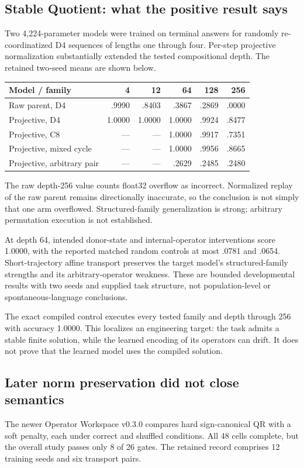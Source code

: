 \documentclass[11pt]{article}
\begin{document}
\subsection{Stable Quotient: what the positive result says}
Two 4,224-parameter models were trained on terminal answers for randomly re-coordinatized D4 sequences of lengths one through four. Per-step projective normalization substantially extended the tested compositional depth. The retained two-seed means are shown below. \cite{n02}

\begin{center}\begin{tabular}{lrrrrr}
\toprule Model / family & 4 & 12 & 64 & 128 & 256\\\midrule
Raw parent, D4 & .9990 & .8403 & .3867 & .2869 & .0000\\
Projective, D4 & 1.0000 & 1.0000 & 1.0000 & .9924 & .8477\\
Projective, C8 & --- & --- & 1.0000 & .9917 & .7351\\
Projective, mixed cycle & --- & --- & 1.0000 & .9956 & .8665\\
Projective, arbitrary pair & --- & --- & .2629 & .2485 & .2480\\\bottomrule
\end{tabular}\end{center}
The raw depth-256 value counts float32 overflow as incorrect. Normalized replay of the raw parent remains directionally inaccurate, so the conclusion is not simply that one arm overflowed. Structured-family generalization is strong; arbitrary permutation execution is not established.

At depth 64, intended donor-state and internal-operator interventions score 1.0000, with the reported matched random controls at most .0781 and .0654. Short-trajectory affine transport preserves the target model's structured-family strengths and its arbitrary-operator weakness. These are bounded developmental results with two seeds and supplied task structure, not population-level or spontaneous-language conclusions.

The exact compiled control executes every tested family and depth through 256 with accuracy 1.0000. This localizes an engineering target: the task admits a stable finite solution, while the learned encoding of its operators can drift. It does not prove that the learned model uses the compiled solution.

\subsection{Later norm preservation did not close semantics}
The newer Operator Workspace v0.3.0 compares hard sign-canonical QR with a soft penalty, each under correct and shuffled conditions. All 48 cells complete, but the overall study passes only 8 of 26 gates. The retained record comprises 12 training seeds and six transport pairs. \cite{nop}
\end{document}
